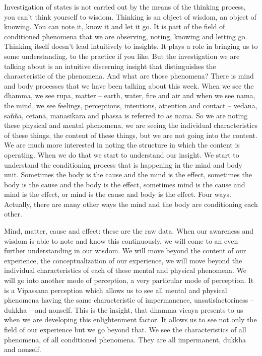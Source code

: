 \documentclass[letterpaper,10pt,english]{sphinxmanual}
\begin{document}
\sphinxAtStartPar
Investigation  of  states  is  not  carried  out  by  the  means  of  the  thinking  process,  you  can’t  think  yourself  to  wisdom. Thinking  is  an  object  of
wisdom, an object of knowing. You can note it, know it and let it go. It is part
  of the field of conditioned phenomena that we are observing, noting, knowing and letting go. Thinking itself doesn’t lead intuitively to insights. It plays
a role in bringing us to some understanding, to the practice if you like. But
the investigation we are talking about is an intuitive discerning insight that
distinguishes the characteristic of the phenomena. And what are those phenomena? There is mind and body processes that we have been talking about
this week. When we see the dhamma, we see rupa, matter – earth, water, fire
and air and when we see nama, the mind, we see feelings, perceptions, intentions, attention and contact – vedanā, saññā, cetanā, manasikāra and phassa
is referred to as nama. So we are noting these physical and mental phenomena, we are seeing the individual characteristics of these things, the content
of these things, but we are not going into the content. We are much more
interested in noting the structure in which the content is operating. When we
do that we start to understand our insight. We start to understand the conditioning process that is happening in the mind and body unit. Sometimes
the body is the cause and the mind is the effect, sometimes the body is the
cause and the body is the effect, sometimes mind is the cause and mind is the
effect, or mind is the cause and body is the effect. Four ways. Actually, there
are many other ways the mind and the body are conditioning each other.

\sphinxAtStartPar
Mind,  matter,  cause  and  effect:  these  are  the  raw  data.  When  our
awareness and wisdom is able to note and know this continuously, we will
come to an even further understanding in our wisdom. We will move beyond
the content of our experience, the conceptualization of our experience, we
will move beyond the individual characteristics of each of these mental and
physical  phenomena.  We  will  go  into  another  mode  of  perception,  a  very
particular mode of perception. It is a Vipassana perception which allows us
to  see  all  mental  and  physical  phenomena  having  the  same  characteristic
of  impermanence,  unsatisfactoriness  –  dukkha  –  and  non\sphinxhyphen{}self.  This  is  the
insight,  that  dhamma  vicaya  presents  to  us  when  we  are  developing  this
enlightenment factor. It allows us to see not only the field of our experience
but we go beyond that. We see the characteristics of all phenomena, of all
conditioned phenomena. They are all impermanent, dukkha and non\sphinxhyphen{}self.
\end{document}
